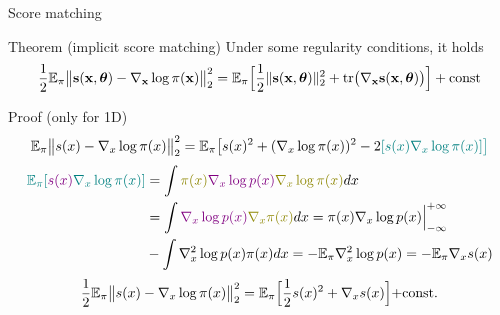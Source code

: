 \begin{frame}{Score matching}
	\begin{block}{Theorem (implicit score matching)}
		Under some regularity conditions, it holds
		\vspace{-0.2cm}
		\[
		\frac{1}{2} \mathbb{E}_{\pi}\bigl\| \mathbf{s}(\mathbf{x}, \boldsymbol{\theta}) - \nabla_{\mathbf{x}} \log \pi(\mathbf{x}) \bigr\|^2_2 = \mathbb{E}_{\pi}\Bigr[ \frac{1}{2}\| \mathbf{s}(\mathbf{x}, \boldsymbol{\theta}) \|_2^2 + \text{tr}\bigl(\nabla_{\mathbf{x}} \mathbf{s}(\mathbf{x}, \boldsymbol{\theta})\bigr) \Bigr] + \text{const}
		\]
		\vspace{-0.6cm}
	\end{block}
	\begin{block}{Proof (only for 1D)}
		\vspace{-0.6cm}
		{\small
			\begin{multline*}
				\mathbb{E}_{\pi}\bigl\| s(x) - \nabla_x \log \pi(x) \bigr\|^2_2 = \mathbb{E}_{\pi} \bigl[ s(x)^2 + (\nabla_x \log \pi(x))^2 - 2{\color{teal}[s(x) \nabla_x \log \pi(x) ] \bigr] }
			\end{multline*}
			\vspace{-0.8cm}
			\begin{align*}
				{\color{teal}\bbE_{\pi} [{\color{violet}s(x) } \nabla_x \log \pi(x) ] } &= \int {\color{olive}\pi(x) {\color{violet}\nabla_x \log p(x)} \nabla_x \log \pi(x)} d x \\ 
				&= \int {\color{violet}\nabla_x \log p(x) } {\color{olive}\nabla_x \pi(x) } dx = \Bigl.\pi(x) \nabla_x \log p(x) \Bigr|_{-\infty}^{+\infty} \\
				&- \int \nabla^2_x \log p(x)  \pi(x) dx =- \bbE_{\pi} \nabla^2_x \log p(x) =- \bbE_{\pi} \nabla_x s(x)
			\end{align*}
			\[
			\frac{1}{2} \mathbb{E}_{\pi}\bigl\| s(x) - \nabla_x \log \pi(x) \bigr\|^2_2 = \mathbb{E}_{\pi} \Bigr[\frac{1}{2} s(x)^2 + \nabla_x s(x) \Bigl]+ \text{const}.
			\]
		}
	\end{block}
\end{frame}
